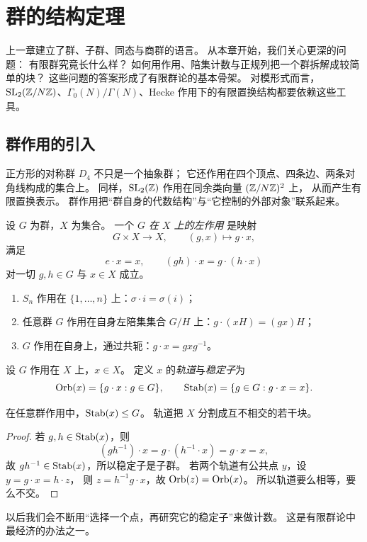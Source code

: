 \chapter{群的结构定理}
上一章建立了群、子群、同态与商群的语言。
从本章开始，我们关心更深的问题：
有限群究竟长什么样？
如何用作用、陪集计数与正规列把一个群拆解成较简单的块？
这些问题的答案形成了有限群论的基本骨架。
对模形式而言，
$\mathrm{SL}_2(\mathbb{Z}/N\mathbb{Z})$、$\Gamma_0(N)/\Gamma(N)$、Hecke 作用下的有限置换结构都要依赖这些工具。
\section{群作用的引入}
\begin{example}[从“对称作用在对象上”开始]
正方形的对称群 $D_4$ 不只是一个抽象群；
它还作用在四个顶点、四条边、两条对角线构成的集合上。
同样，$\mathrm{SL}_2(\mathbb{Z})$ 作用在同余类向量 $(\mathbb{Z}/N\mathbb{Z})^2$ 上，
从而产生有限置换表示。
群作用把“群自身的代数结构”与“它控制的外部对象”联系起来。
\end{example}
\begin{definition}
设 $G$ 为群，$X$ 为集合。
一个 \emph{$G$ 在 $X$ 上的左作用} 是映射
\[
G\times X\to X,\qquad (g,x)\mapsto g\cdot x,
\]
满足
\[
 e\cdot x=x,\qquad (gh)\cdot x=g\cdot(h\cdot x)
\]
对一切 $g,h\in G$ 与 $x\in X$ 成立。
\end{definition}
\begin{example}
\begin{enumerate}[label=\textnormal{(\arabic*)}, leftmargin=3em]
  \item $S_n$ 作用在 $\{1,\dots,n\}$ 上：$\sigma\cdot i=\sigma(i)$；
  \item 任意群 $G$ 作用在自身左陪集集合 $G/H$ 上：$g\cdot(xH)=(gx)H$；
  \item $G$ 作用在自身上，通过共轭：$g\cdot x=gxg^{-1}$。
\end{enumerate}
\end{example}
\begin{definition}
设 $G$ 作用在 $X$ 上，$x\in X$。
定义 $x$ 的\emph{轨道}与\emph{稳定子}为
\[
\operatorname{Orb}(x)=\{g\cdot x:g\in G\},
\qquad
\operatorname{Stab}(x)=\{g\in G:g\cdot x=x\}.
\]
\end{definition}
\begin{proposition}
在任意群作用中，$\operatorname{Stab}(x)\le G$。
轨道把 $X$ 分割成互不相交的若干块。
\end{proposition}
\begin{proof}
若 $g,h\in\operatorname{Stab}(x)$，则
\[
(gh^{-1})\cdot x=g\cdot(h^{-1}\cdot x)=g\cdot x=x,
\]
故 $gh^{-1}\in\operatorname{Stab}(x)$，所以稳定子是子群。
若两个轨道有公共点 $y$，设 $y=g\cdot x=h\cdot z$，
则 $z=h^{-1}g\cdot x$，故 $\operatorname{Orb}(z)=\operatorname{Orb}(x)$。
所以轨道要么相等，要么不交。
\end{proof}
\begin{remark}
以后我们会不断用“选择一个点，再研究它的稳定子”来做计数。
这是有限群论中最经济的办法之一。
\end{remark}
